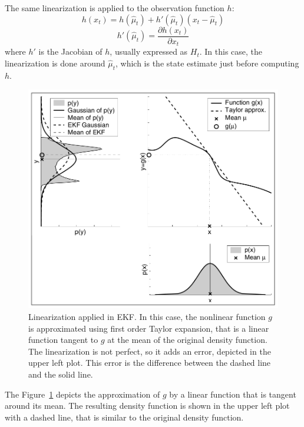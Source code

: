 The same linearization is applied to the observation function $h$:
\begin{equation}
    h\left(x_t\right) = h\left(\hat\mu_t\right) + h'\left(\hat\mu_t\right)\left(x_t - \hat\mu_t\right)
\end{equation}
\begin{equation}
        h'\left(\hat\mu_t\right) = \frac{\partial h\left(x_t\right)}{\partial x_t}
\end{equation}
where $h'$ is the Jacobian of $h$, usually expressed as $H_t$. In this case, the linearization is done around $\hat\mu_t$, which is the state estimate just before computing $h$.\\

\begin{figure}[h]
    \centering
    \includegraphics{Images/fig2-ekf-linearization.png}
    \caption[Linearization applied in EKF]{Linearization applied in \ac{EKF}. In this case, the nonlinear function $g$ is approximated using first order Taylor expansion, that is a linear function tangent to $g$ at the mean of the original density function. The linearization is not perfect, so it adds an error, depicted in the upper left plot. This error is the difference between the dashed line and the solid line. \cite{prob-robotics}}
    \label{fig:chapter1:kf:ekf:ekf-linearization}
\end{figure}

The Figure~\ref{fig:chapter1:kf:ekf:ekf-linearization} depicts the approximation of $g$ by a linear function that is tangent around its mean. The resulting density function is shown in the upper left plot with a dashed line, that is similar to the original density function.\\

